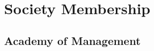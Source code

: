 \documentclass[12pt,letterpaper]{report} %
\newcommand{\listitemspace}{0em}
\renewenvironment{itemize}
{\begin{list}{}{\setlength{\leftmargin}{0em}
                \setlength{\parskip}{0em}
                \setlength{\itemsep}{\listitemspace}
                \setlength{\parsep}{\listitemspace}}}
{\end{list}}
\begin{document}














    \section*{Society Membership}

    \subsection*{Academy of Management}
\end{document}

